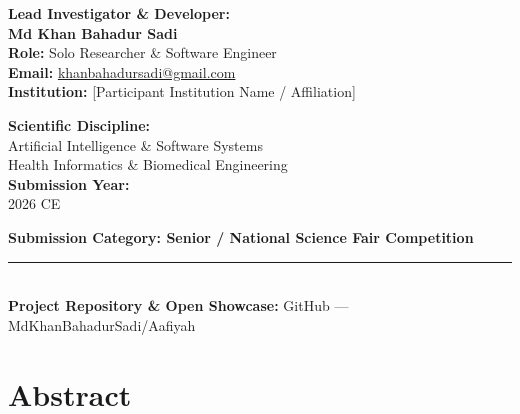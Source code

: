 \documentclass[12pt,a4paper,oneside]{report}
\begin{document}
\begin{titlepage}
\begin{tcolorbox}
    \vspace{1.2cm}
    \begin{minipage}[t]{0.48\textwidth}
        \flushleft
        \textbf{\large Lead Investigator \& Developer:}\\[0.2cm]
        \textbf{\Large Md Khan Bahadur Sadi}\\[0.1cm]
        \textbf{Role:} Solo Researcher \& Software Engineer\\[0.1cm]
        \textbf{Email:} \href{mailto:khanbahadursadi@gmail.com}{khanbahadursadi@gmail.com}\\[0.1cm]
        \textbf{Institution:} [Participant Institution Name / Affiliation]
    \end{minipage}
    \hfill
    \begin{minipage}[t]{0.48\textwidth}
        \flushright
        \textbf{\large Scientific Discipline:}\\[0.2cm]
        Artificial Intelligence \& Software Systems\\
        Health Informatics \& Biomedical Engineering\\[0.5cm]
        \textbf{Submission Year:}\\
        2026 CE
    \end{minipage}

    \vfill
    {\large\textbf{Submission Category: Senior / National Science Fair Competition}\par}
    \vspace{0.3cm}
    \textcolor{deepEmerald}{\rule{8cm}{0.8pt}}\\[0.2cm]
    {\small\textbf{Project Repository \& Open Showcase:} GitHub --- MdKhanBahadurSadi/Aafiyah}
    \end{tcolorbox}
\end{titlepage}

\tableofcontents
\newpage
\listoffigures
\newpage
\listoftables
\newpage

\setcounter{page}{1}

\chapter{Abstract}
\end{document}
